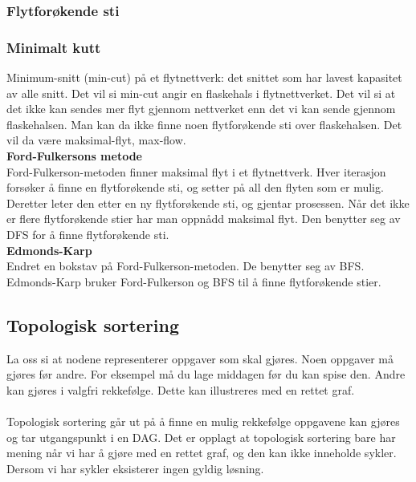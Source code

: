 \subsubsection{Flytforøkende sti}
\subsubsection{Minimalt kutt}
Minimum-snitt (min-cut) på et flytnettverk: det snittet som har lavest kapasitet av alle snitt. Det vil si min-cut angir en flaskehals i flytnettverket. Det vil si at det ikke kan sendes mer flyt gjennom nettverket enn det vi kan sende gjennom flaskehalsen. Man kan da ikke finne noen flytforøkende sti over flaskehalsen. Det vil da være maksimal-flyt, max-flow.\\

\noindent \textbf{Ford-Fulkersons metode}\\
Ford-Fulkerson-metoden finner maksimal flyt i et flytnettverk. Hver iterasjon forsøker å finne en flytforøkende sti, og setter på all den flyten som er mulig. Deretter leter den etter en ny flytforøkende sti, og gjentar prosessen. Når det ikke er flere flytforøkende stier har man oppnådd maksimal flyt. Den benytter seg av DFS for å finne flytforøkende sti.
\\

\noindent \textbf{Edmonds-Karp}\\
Endret en bokstav på Ford-Fulkerson-metoden. De benytter seg av BFS. Edmonds-Karp bruker Ford-Fulkerson og BFS til å finne flytforøkende stier.\\

\subsection{Topologisk sortering}
La oss si at nodene representerer oppgaver som skal gjøres. Noen oppgaver må gjøres før andre. For eksempel må du lage middagen før du kan spise den. Andre kan gjøres i valgfri rekkefølge. Dette kan illustreres med en rettet graf.
\\\\
Topologisk sortering går ut på å finne en mulig rekkefølge oppgavene kan gjøres og tar utgangspunkt i en DAG. Det er opplagt at topologisk sortering bare har mening når vi har å gjøre med en rettet graf, og den kan ikke inneholde sykler. Dersom vi har sykler eksisterer ingen gyldig løsning.

